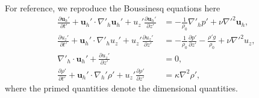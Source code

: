For reference, we reproduce the Boussinesq equations here 
\begin{align}
\frac{\partial \textbf{u}_{h}'}{\partial t'} + \textbf{u}_{h}'\cdot\nabla'_{h}\textbf{u}_{h}'+u_{z}'\frac{\partial \textbf{u}_{h}'}{\partial z'} &= -\frac{1}{\rho_{0}}\nabla'_{h}p' + \nu \nabla'^{2}\textbf{u}_{h},\\
\frac{\partial u_{z}'}{\partial t'} + \textbf{u}_{h}'\cdot\nabla'_{h}u_{z}'+u_{z}'\frac{\partial u_{z}'}{\partial z'} &= -\frac{1}{\rho_{0}}\frac{\partial p'}{\partial z'} - \frac{\rho' g}{\rho_{0}} + \nu \nabla'^{2}u_{z},\\
\nabla'_{h}\cdot\textbf{u}_{h}' + \frac{\partial u_{z}'}{\partial z'} &=0,\\
\frac{\partial \rho'}{\partial t'} + \textbf{u}_{h}'\cdot\nabla_{h}'\rho' + u_{z}'\frac{\partial \rho'}{\partial z'}  &=\kappa\nabla^{2}\rho ',
\end{align}
where the primed quantities denote the dimensional quantities. 

